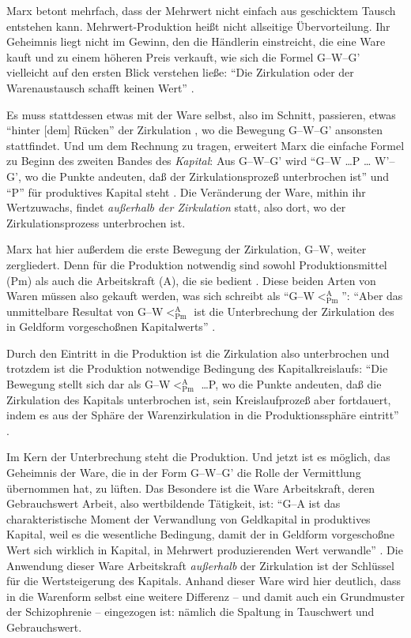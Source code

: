 \documentclass[12pt,
               DIV13,
               paper=a4,
               twoside=false,
               onehalfspacing,
               bibliography=totoc,
               toc=graduated,
               draft,
               ]{scrartcl}
\newcommand{\pc}[2]{\parencite[#1]{#2}}
\newcommand{\vgl}[2]{\parencite[vgl.][#1]{#2}}
\newcommand{\gwg}{G--W--G'\xspace}
\newcommand{\gwapm}{G--W$<^{\text{A}}_{\text{Pm}}$\xspace}
\newcommand{\gwapmp}{G--W$<^{\text{A}}_{\text{Pm}}$ \dots P\xspace}
\begin{document}

Marx betont mehrfach, dass der Mehrwert nicht einfach aus geschicktem
Tausch entstehen kann. Mehrwert-Produktion heißt nicht allseitige
Übervorteilung. Ihr Geheimnis liegt nicht im Gewinn, den die Händlerin
einstreicht, die eine Ware kauft und zu einem höheren Preis verkauft,
wie sich die Formel \gwg vielleicht auf den ersten Blick verstehen
ließe: "`Die Zirkulation oder der Warenaustausch schafft keinen Wert"'
\pc{178}{kap}.


Es muss stattdessen etwas mit der Ware selbst, also im Schnitt,
passieren, etwas "`hinter [dem] Rücken"' der Zirkulation
\pc{181}{kap}, wo die Bewegung \gwg ansonsten stattfindet. Und um dem
Rechnung zu tragen, erweitert Marx die einfache Formel zu Beginn des
zweiten Bandes des \emph{Kapital}: Aus \gwg wird "`G--W \dots P \dots
W'--G', wo die Punkte andeuten, daß der Zirkulationsprozeß
unterbrochen ist"' \pc{31}{kap2} und "`P"' für produktives Kapital
steht \vgl{34}{kap2}. Die Veränderung der Ware, mithin ihr
Wertzuwachs, findet \emph{außerhalb der Zirkulation} statt, also dort,
wo der Zirkulationsprozess unterbrochen ist.


Marx hat hier außerdem die erste Bewegung der Zirkulation, G--W,
weiter zergliedert. Denn für die Produktion notwendig sind sowohl
Produktionsmittel (Pm) als auch die Arbeitskraft (A), die sie bedient
\vgl{32}{kap2}. Diese beiden Arten von Waren müssen also gekauft
werden, was sich schreibt als "`\gwapm"': "`Aber das unmittelbare
Resultat von \gwapm ist die Unterbrechung der Zirkulation des in
Geldform vorgeschoßnen Kapitalwerts"' \pc{40}{kap2}.

Durch den Eintritt in die Produktion ist die Zirkulation also
unterbrochen und trotzdem ist die Produktion notwendige Bedingung des
Kapitalkreislaufs: "`Die Bewegung stellt sich dar als \gwapmp, wo die
Punkte andeuten, daß die Zirkulation des Kapitals unterbrochen ist,
sein Kreislaufprozeß aber fortdauert, indem es aus der Sphäre der
Warenzirkulation in die Produktionssphäre eintritt"' \pc{40}{kap2}.


Im Kern der Unterbrechung steht die Produktion. Und jetzt ist es
möglich, das Geheimnis der Ware, die in der Form \gwg die Rolle der
Vermittlung übernommen hat, zu lüften. Das Besondere ist die Ware
Arbeitskraft, deren Gebrauchswert Arbeit, also wertbildende Tätigkeit,
ist: "`G--A ist das charakteristische Moment der Verwandlung von
Geldkapital in produktives Kapital, weil es die wesentliche Bedingung,
damit der in Geldform vorgeschoßne Wert sich wirklich in Kapital, in
Mehrwert produzierenden Wert verwandle"' \pc{35}{kap2}. Die Anwendung
dieser Ware Arbeitskraft \emph{außerhalb} der Zirkulation ist der
Schlüssel für die Wertsteigerung des Kapitals. Anhand dieser Ware wird
hier deutlich, dass in die Warenform selbst eine weitere Differenz --
und damit auch ein Grundmuster der Schizophrenie -- eingezogen ist:
nämlich die Spaltung in Tauschwert und Gebrauchswert.
\end{document}
